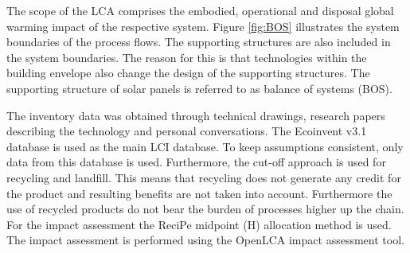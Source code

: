 The scope of the LCA comprises the embodied, operational and disposal global warming impact of the respective system. Figure \ref{fig:BOS} illustrates the system boundaries of the process flows. The supporting structures are also included in the system boundaries. The reason for this is that technologies within the building envelope also change the design of the supporting structures. The supporting structure of solar panels is referred to as balance of systems (BOS).



The inventory data was obtained through technical drawings, research papers describing the technology and personal conversations. The Ecoinvent v3.1 database is used as the main LCI database. To keep assumptions consistent, only data from this database is used. Furthermore, the cut-off approach is used for recycling and landfill. This means that recycling does not generate any credit for the product and resulting benefits are not taken into account. Furthermore the use of recycled products do not bear the burden of processes higher up the chain.\\

For the impact assessment the ReciPe midpoint (H) allocation method is used. The impact assessment is performed using the OpenLCA impact assessment tool.


